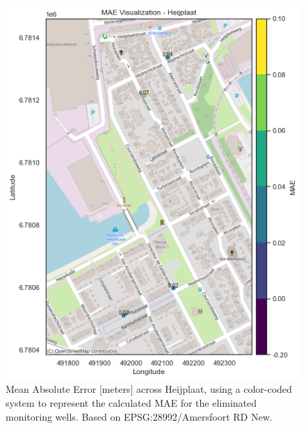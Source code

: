 \begin{figure}[htbp]
    \centering
    \includegraphics[width=0.75\linewidth]{frontmatter/Heijplaat-fig/maeheij.png}
    \caption{Mean Absolute Error [meters] across Heijplaat, using a color-coded system to represent the calculated MAE for the eliminated monitoring wells. Based on EPSG:28992/Amersfoort RD New.}
    \label{maeheij}
\end{figure}
\clearpage

